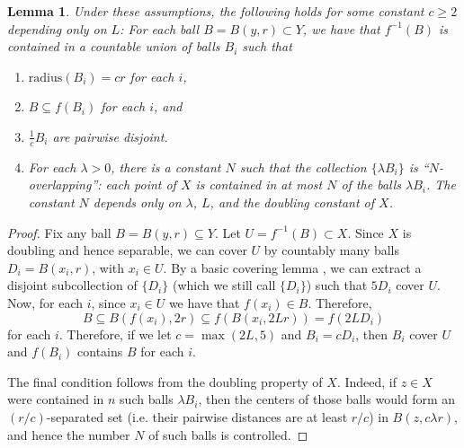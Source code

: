 \documentclass{amsart}
\theoremstyle{plain}
\newtheorem{lemma}[theorem]{Lemma}
\theoremstyle{definition}
\numberwithin{equation}{section}
\numberwithin{theorem}{section}
\begin{document}
\begin{lemma}\label{lem:cover}
Under these assumptions, the following holds for some constant $c\geq 2$ depending only on $L$: For each ball $B=B(y,r)\subset Y$, we have that $f^{-1}(B)$ is contained in a countable union of balls $B_i$ such that
\begin{enumerate}
\item $\text{radius}(B_i) = cr$ for each $i$,
\item $B\subseteq f(B_i)$ for each $i$, and
\item $\frac{1}{c}B_i$ are pairwise disjoint.
\item For each $\lambda>0$, there is a constant $N$ such that the collection $\{\lambda B_i\}$ is ``$N$-overlapping'': each point of $X$ is contained in at most $N$ of the balls $\lambda B_i$. The constant $N$ depends only on $\lambda$, $L$, and the doubling constant of $X$.
\end{enumerate}
\end{lemma}
\begin{proof}
Fix any ball $B=B(y,r)\subseteq Y$. Let $U=f^{-1}(B)\subset X$. Since $X$ is doubling and hence separable, we can cover $U$ by countably many balls $D_i = B(x_i,r)$, with $x_i\in U$. By a basic covering lemma  \cite[Theorem 1.4]{He}, we can extract a disjoint subcollection of $\{D_i\}$ (which we still call $\{D_i\}$) such that $5D_i$ cover $U$. Now, for each $i$, since $x_i\in U$ we have that $f(x_i)\in B$. Therefore,
$$ B \subseteq B(f(x_i), 2r) \subseteq f(B(x_i, 2Lr)) = f(2LD_i)$$
for each $i$. Therefore, if we let $c=\max(2L,5)$ and $B_i = cD_i$, then $B_i$ cover $U$ and $f(B_i)$ contains $B$ for each $i$.

The final condition follows from the doubling property of $X$. Indeed, if $z\in X$ were contained in $n$ such balls $\lambda B_i$, then the centers of those balls would form an $(r/c)$-separated set (i.e. their pairwise distances are at least $r/c$) in $B(z,c\lambda r)$, and hence the number $N$ of such balls is controlled. 
\end{proof}
\end{document}
